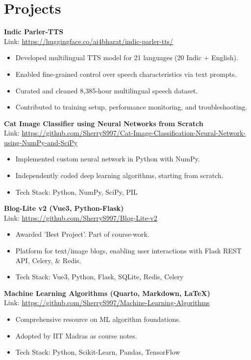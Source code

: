\documentclass[a4paper,10pt]{article}
\begin{document}
\section*{Projects}
\textbf{Indic Parler-TTS} \\
Link: \url{https://huggingface.co/ai4bharat/indic-parler-tts/}  
\begin{itemize}[noitemsep]
    \item Developed multilingual TTS model for 21 languages (20 Indic + English).
    \item Enabled fine-grained control over speech characteristics via text prompts.
    \item Curated and cleaned 8,385-hour multilingual speech dataset.
    \item Contributed to training setup, performance monitoring, and troubleshooting.
\end{itemize}
\textbf{Cat Image Classifier using Neural Networks from Scratch} \\
Link: \url{https://github.com/SherryS997/Cat-Image-Classification-Neural-Network-using-NumPy-and-SciPy}  
\begin{itemize}[noitemsep]
    \item Implemented custom neural network in Python with NumPy.
    \item Independently coded deep learning algorithms, starting from scratch.
    \item Tech Stack: Python, NumPy, SciPy, PIL
\end{itemize}
\textbf{Blog-Lite v2 (Vue3, Python-Flask)} \\
Link: \url{https://github.com/SherryS997/Blog-Lite-v2}  
\begin{itemize}[noitemsep]
    \item Awarded 'Best Project'. Part of course-work.
    \item Platform for text/image blogs, enabling user interactions with Flask REST API, Celery, & Redis.
    \item Tech Stack: Vue3, Python, Flask, SQLite, Redis, Celery
\end{itemize}
\textbf{Machine Learning Algorithms (Quarto, Markdown, LaTeX)} \\
Link: \url{https://github.com/SherryS997/Machine-Learning-Algorithms}  
\begin{itemize}[noitemsep]
    \item Comprehensive resource on ML algorithm foundations.
    \item Adopted by IIT Madras as course notes.
    \item Tech Stack: Python, Scikit-Learn, Pandas, TensorFlow
\end{itemize}
\end{document}
